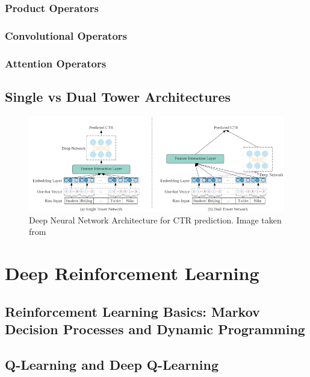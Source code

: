 \documentclass{mldsmsc}
\begin{document}
\subsubsection{Product Operators}

\subsubsection{Convolutional Operators}

\subsubsection{Attention Operators}

\subsection{Single vs Dual Tower Architectures}


\begin{figure}[h]
\centering
\includegraphics[width=\textwidth]{../figures/single_dual_dnn.png}
\caption{Deep Neural Network Architecture for CTR prediction. Image taken from \cite{RefWorks:zhang2021deep}}
\label{fig:dnn_architecture}
\end{figure}



\section{Deep Reinforcement Learning}

\subsection{Reinforcement Learning Basics: Markov Decision Processes and Dynamic Programming}

\subsection{Q-Learning and Deep Q-Learning}
\end{document}
